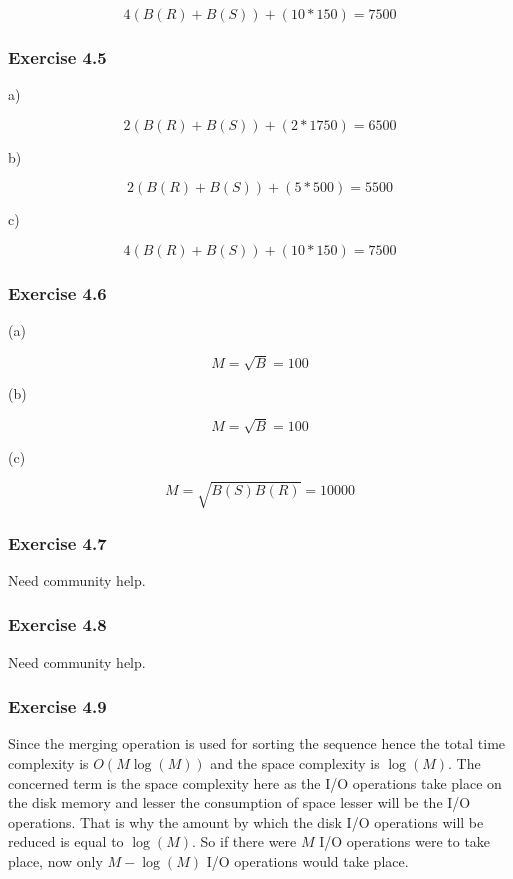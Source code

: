 \documentclass[../../main.tex]{subfiles}
\begin{document}
$$
4 (B(R)+B(S)) + (10 * 150) = 7500
$$

\subsubsection*{Exercise 4.5}

a)

$$
2 (B(R)+B(S)) + (2 * 1750) = 6500
$$

b)

$$
2 (B(R)+B(S)) + (5 * 500) = 5500
$$

c)

$$
4 (B(R)+B(S)) + (10 * 150) = 7500
$$

\subsubsection*{Exercise 4.6}

(a)

$$
M = \sqrt{B} = 100
$$

(b)

$$
M = \sqrt{B} = 100
$$

(c)

$$
M = \sqrt{B(S)B(R)} = 10000
$$

\subsubsection*{Exercise 4.7}

Need community help.

\subsubsection*{Exercise 4.8}

Need community help.

\subsubsection*{Exercise 4.9}

Since the merging operation is used for sorting the sequence hence the
total time complexity is $O(M\log(M))$ and the space complexity
is $\log(M)$. The concerned term is the space complexity
here as the I/O operations take place on the disk memory and lesser the
consumption of space lesser will be the I/O operations. That is why the
amount by which the disk I/O operations will be reduced is equal to
$\log(M)$. So if there were $M$ I/O operations were to take place, now only $M
- \log(M)$ I/O operations would take place.
\end{document}
